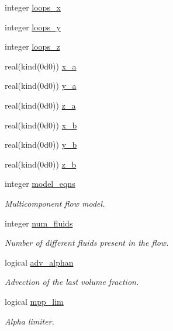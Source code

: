 \begin{DoxyCompactItemize}
\item 
integer \hyperlink{namespacem__global__parameters_a35f17d72a6c9e18aae51a5131d2c9303}{loops\+\_\+x}
\item 
integer \hyperlink{namespacem__global__parameters_af8c939272b6741337359fd99e419fba1}{loops\+\_\+y}
\item 
integer \hyperlink{namespacem__global__parameters_a5cfb837ca862adc01d2ba0dce83fbd17}{loops\+\_\+z}
\item 
real(kind(0d0)) \hyperlink{namespacem__global__parameters_a7d6df53840be063479492e0034b34b11}{x\+\_\+a}
\item 
real(kind(0d0)) \hyperlink{namespacem__global__parameters_ab19fa915c817b9b6697827d8ce059797}{y\+\_\+a}
\item 
real(kind(0d0)) \hyperlink{namespacem__global__parameters_a65b092136a85b466956efe77c639dc27}{z\+\_\+a}
\item 
real(kind(0d0)) \hyperlink{namespacem__global__parameters_ab43cefe0ef4c4b75b1d99842a8626393}{x\+\_\+b}
\item 
real(kind(0d0)) \hyperlink{namespacem__global__parameters_ae6deea785ef4dbdb572a8eb6f30b7c3a}{y\+\_\+b}
\item 
real(kind(0d0)) \hyperlink{namespacem__global__parameters_accc52011bfc1383c99125f030792ba6b}{z\+\_\+b}
\item 
integer \hyperlink{namespacem__global__parameters_a6cf2e92cfc3b519fb6da6fe9e88fab31}{model\+\_\+eqns}
\begin{DoxyCompactList}\small\item\em Multicomponent flow model. \end{DoxyCompactList}\item 
integer \hyperlink{namespacem__global__parameters_a2f0b96a5aef3925aa7e3cc816754e17e}{num\+\_\+fluids}
\begin{DoxyCompactList}\small\item\em Number of different fluids present in the flow. \end{DoxyCompactList}\item 
logical \hyperlink{namespacem__global__parameters_abebd95d9d0271fbda40f47f75a2d829b}{adv\+\_\+alphan}
\begin{DoxyCompactList}\small\item\em Advection of the last volume fraction. \end{DoxyCompactList}\item 
logical \hyperlink{namespacem__global__parameters_adc35ba450a192812db36f1d6659d64e6}{mpp\+\_\+lim}
\begin{DoxyCompactList}\small\item\em Alpha limiter. \end{DoxyCompactList}\item 

\end{DoxyCompactItemize}
